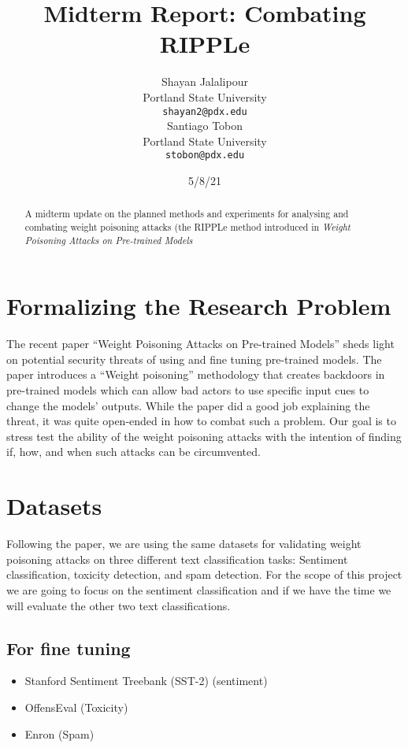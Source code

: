 \documentclass[11pt,a4paper]{article}
\title{Midterm Report: Combating RIPPLe}
\author{Shayan Jalalipour \\
  Portland State University\\
  \texttt{shayan2@pdx.edu} \\\And
  Santiago Tobon \\
  Portland State University \\
  \texttt{stobon@pdx.edu} \\}
\date{5/8/21}
\begin{document}
\maketitle
\begin{abstract}
A midterm update on the planned methods and experiments for analysing and combating weight poisoning attacks (the RIPPLe method introduced in \emph{Weight Poisoning Attacks on Pre-trained Models} \cite{ripple}
\end{abstract}


\section{Formalizing the Research Problem}

The recent paper “Weight Poisoning Attacks on Pre-trained Models” sheds light on potential security threats of using and fine tuning pre-trained models. \cite{ripple} The paper introduces a “Weight poisoning” methodology that creates backdoors in pre-trained models which can allow bad actors to use specific input cues to change the models’ outputs.
While the paper did a good job explaining the threat, it was quite open-ended in how to combat such a problem. Our goal is to stress test the ability of the weight poisoning attacks with the intention of finding if, how, and when such attacks can be circumvented.

\section{Datasets}

Following the paper, we are using the same datasets for validating weight poisoning attacks on three different text classification tasks: Sentiment classification, toxicity detection, and spam detection. For the scope of this project we are going to focus on the sentiment classification and if we have the time we will evaluate the other two text classifications.

\subsection{For fine tuning}
\begin{itemize}
    \item Stanford Sentiment Treebank (SST-2) (sentiment)
    \item OffensEval (Toxicity)
    \item Enron (Spam)
\end{itemize}
\end{document}
